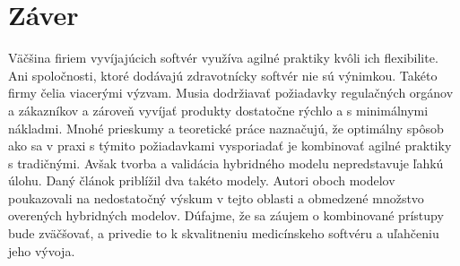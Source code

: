 \documentclass[10pt,twoside,slovak,a4paper]{article}
\begin{document}
\section{Záver}
Väčšina firiem vyvíjajúcich softvér využíva agilné praktiky kvôli ich flexibilite. Ani spoločnosti, ktoré dodávajú zdravotnícky softvér nie sú výnimkou. Takéto firmy čelia viacerými výzvam. Musia dodržiavať požiadavky regulačných orgánov a zákazníkov a zároveň vyvíjať produkty dostatočne rýchlo a s minimálnymi nákladmi. Mnohé prieskumy a teoretické práce naznačujú, že optimálny spôsob ako sa v praxi s týmito požiadavkami vysporiadať je kombinovať agilné praktiky s tradičnými. Avšak tvorba a validácia hybridného modelu nepredstavuje ľahkú úlohu. Daný článok priblížil dva takéto modely. Autori oboch modelov poukazovali na nedostatočný výskum v tejto oblasti a obmedzené množstvo overených hybridných modelov. Dúfajme, že sa záujem o kombinované prístupy bude zväčšovať, a privedie to k skvalitneniu medicínskeho softvéru a uľahčeniu jeho vývoja.


 
\end{document}
